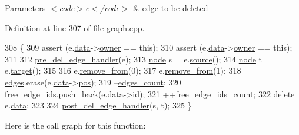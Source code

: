 \begin{DoxyParams}{Parameters}
{\em $<$code$>$e$<$/code$>$} & edge to be deleted \\
\hline
\end{DoxyParams}


Definition at line 307 of file graph.\+cpp.


\begin{DoxyCode}
308 \{
309     assert (e.\mbox{\hyperlink{classedge_a0ebb6dfa28b77f47529085049352b436}{data}}->\mbox{\hyperlink{classedge__data_a00436f2956a69cd9dc8e5bfa530e0ce9}{owner}} == \textcolor{keyword}{this});
310     assert (e.\mbox{\hyperlink{classedge_a0ebb6dfa28b77f47529085049352b436}{data}}->\mbox{\hyperlink{classedge__data_a00436f2956a69cd9dc8e5bfa530e0ce9}{owner}} == \textcolor{keyword}{this});
311 
312     \mbox{\hyperlink{classgraph_a2cd0986dc5bcbfdbf0635c39e610784b}{pre\_del\_edge\_handler}}(e);
313     \mbox{\hyperlink{classnode}{node}} s = e.\mbox{\hyperlink{classedge_ae82d5701f7e6f71edc3c8b0e34bcd2b7}{source}}();
314     \mbox{\hyperlink{classnode}{node}} t = e.\mbox{\hyperlink{classedge_a97563b611261478ee19c6ce055f1a3ee}{target}}();
315 
316     e.\mbox{\hyperlink{classedge_abcd4eeaf23327d026beac9ee1d0fa7e9}{remove\_from}}(0);
317     e.\mbox{\hyperlink{classedge_abcd4eeaf23327d026beac9ee1d0fa7e9}{remove\_from}}(1);
318     \mbox{\hyperlink{classgraph_ab5b1c610cca1bcf72b05aacc28a48153}{edges}}.erase(e.\mbox{\hyperlink{classedge_a0ebb6dfa28b77f47529085049352b436}{data}}->\mbox{\hyperlink{classedge__data_a178a8fd40a6ec8139291f96a7807f711}{pos}});
319     --\mbox{\hyperlink{classgraph_af560ff4263ad165c166a46084e781b4a}{edges\_count}};
320     \mbox{\hyperlink{classgraph_a2bef57ea1db5b5541b3cce866de179f0}{free\_edge\_ids}}.push\_back(e.\mbox{\hyperlink{classedge_a0ebb6dfa28b77f47529085049352b436}{data}}->\mbox{\hyperlink{classedge__data_a33597ce417f8d86697b03fc8b6fea526}{id}});
321     ++\mbox{\hyperlink{classgraph_a336be547b5e0ca43b96cf00131e0e1da}{free\_edge\_ids\_count}};
322     \textcolor{keyword}{delete} e.\mbox{\hyperlink{classedge_a0ebb6dfa28b77f47529085049352b436}{data}};
323 
324     \mbox{\hyperlink{classgraph_ab9ac8bcc7288986de69cd467beb33600}{post\_del\_edge\_handler}}(s, t);
325 \}
\end{DoxyCode}
Here is the call graph for this function\+:
\nopagebreak
